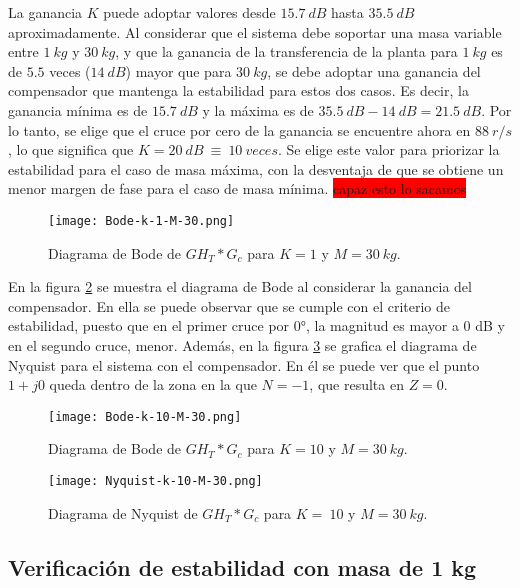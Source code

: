 La ganancia $K$ puede adoptar valores desde $15.7\:dB$ hasta $35.5\:dB$ aproximadamente. Al considerar que el sistema debe soportar una masa variable entre $1\:kg$ y $30\:kg$, y que la ganancia de la transferencia de la planta para $1\:kg$ es de $5.5$ veces ($14\:dB$) mayor que para $30\:kg$, se debe adoptar una ganancia del compensador que mantenga la estabilidad para estos dos casos. Es decir, la ganancia mínima es de $15.7\:dB$ y la máxima es de $35.5\:dB - 14\:dB = 21.5\:dB$. Por lo tanto, se elige que el cruce por cero de la ganancia se encuentre ahora en $88\:r/s$, lo que significa que $K=20\:dB\ \equiv \ 10\: veces$. Se elige este valor para priorizar la estabilidad para el caso de masa máxima, con la desventaja de que se obtiene un menor margen de fase para el caso de masa mínima. \colorbox{red}{capaz esto lo sacamos}


\begin{figure}[H]
	\centering
	\texttt{[image: Bode-k-1-M-30.png]}
	\caption{Diagrama de Bode de $GH_T*G_c$ para $K=1$ y $M=30\:kg$.}
	\label{fig:bode-analog-compensado-para-k-1}
\end{figure}

\noindent En la figura \ref{fig:bode-analog-compensado-para-k-10} se muestra el diagrama de Bode al considerar la ganancia del compensador. En ella se puede observar que se  cumple con el criterio de estabilidad, puesto que en el primer cruce por 0°, la magnitud es mayor a 0 dB y en el segundo cruce, menor. Además, en la figura \ref{fig:nyquist-analog-para-k-10} se grafica el diagrama de Nyquist para el sistema con el compensador. En él se puede ver que el punto $1+j0$ queda dentro de la zona en la que $N=-1$, que resulta en $Z=0$.

\begin{figure}[H]
	\centering
	\texttt{[image: Bode-k-10-M-30.png]}
	\caption{Diagrama de Bode de $GH_{T}*G_c$ para $K=10$ y $M=30\:kg$.}
	\label{fig:bode-analog-compensado-para-k-10}
\end{figure}

\begin{figure}[H]
	\centering
	\texttt{[image: Nyquist-k-10-M-30.png]}
	\caption{Diagrama de Nyquist de $GH_T*G_c$ para $K=\:10$ y $M=30\:kg$.}
	\label{fig:nyquist-analog-para-k-10}
\end{figure}


\subsection{Verificación de estabilidad con masa de 1 kg}

